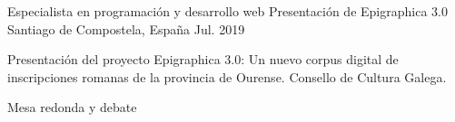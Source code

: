
\begin{cventries}
  \cventry
    {Especialista en programación y desarrollo web}
    {Presentación de Epigraphica 3.0}
    {Santiago de Compostela, España}
    {Jul. 2019}
    {
      \begin{cvitems}
        \item {Presentación del proyecto Epigraphica 3.0: Un nuevo corpus digital de inscripciones romanas de la provincia de Ourense. Consello de Cultura Galega.}
        \item {Mesa redonda y debate}
      \end{cvitems}
    }
\end{cventries}
